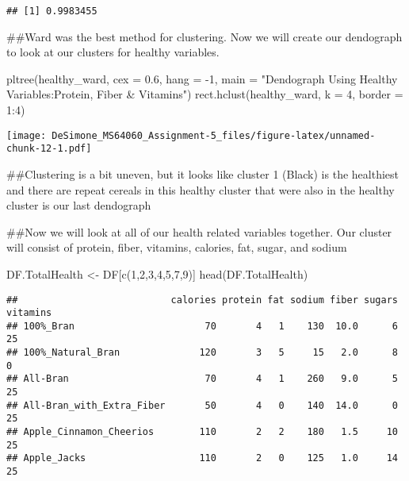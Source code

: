 \documentclass[
]{article}
\newenvironment{Shaded}{\begin{snugshade}}{\end{snugshade}}
\newcommand{\AttributeTok}[1]{\textcolor[rgb]{0.77,0.63,0.00}{#1}}
\newcommand{\DecValTok}[1]{\textcolor[rgb]{0.00,0.00,0.81}{#1}}
\newcommand{\FloatTok}[1]{\textcolor[rgb]{0.00,0.00,0.81}{#1}}
\newcommand{\FunctionTok}[1]{\textcolor[rgb]{0.00,0.00,0.00}{#1}}
\newcommand{\NormalTok}[1]{#1}
\newcommand{\OtherTok}[1]{\textcolor[rgb]{0.56,0.35,0.01}{#1}}
\newcommand{\SpecialCharTok}[1]{\textcolor[rgb]{0.00,0.00,0.00}{#1}}
\newcommand{\StringTok}[1]{\textcolor[rgb]{0.31,0.60,0.02}{#1}}
\begin{document}
\begin{verbatim}
## [1] 0.9983455
\end{verbatim}

\#\#Ward was the best method for clustering. Now we will create our
dendograph to look at our clusters for healthy variables.

\begin{Shaded}
\begin{Highlighting}[]
\FunctionTok{pltree}\NormalTok{(healthy\_ward, }\AttributeTok{cex =} \FloatTok{0.6}\NormalTok{, }\AttributeTok{hang =} \SpecialCharTok{{-}}\DecValTok{1}\NormalTok{, }\AttributeTok{main =} \StringTok{"Dendograph Using Healthy Variables:Protein, Fiber \& Vitamins"}\NormalTok{)}
\FunctionTok{rect.hclust}\NormalTok{(healthy\_ward, }\AttributeTok{k =} \DecValTok{4}\NormalTok{, }\AttributeTok{border =} \DecValTok{1}\SpecialCharTok{:}\DecValTok{4}\NormalTok{)}
\end{Highlighting}
\end{Shaded}

\texttt{[image: DeSimone\_MS64060\_Assignment-5\_files/figure-latex/unnamed-chunk-12-1.pdf]}

\#\#Clustering is a bit uneven, but it looks like cluster 1 (Black) is
the healthiest and there are repeat cereals in this healthy cluster that
were also in the healthy cluster is our last dendograph

\#\#Now we will look at all of our health related variables together.
Our cluster will consist of protein, fiber, vitamins, calories, fat,
sugar, and sodium

\begin{Shaded}
\begin{Highlighting}[]
\NormalTok{DF.TotalHealth }\OtherTok{\textless{}{-}}\NormalTok{ DF[}\FunctionTok{c}\NormalTok{(}\DecValTok{1}\NormalTok{,}\DecValTok{2}\NormalTok{,}\DecValTok{3}\NormalTok{,}\DecValTok{4}\NormalTok{,}\DecValTok{5}\NormalTok{,}\DecValTok{7}\NormalTok{,}\DecValTok{9}\NormalTok{)]}
\FunctionTok{head}\NormalTok{(DF.TotalHealth)}
\end{Highlighting}
\end{Shaded}

\begin{verbatim}
##                           calories protein fat sodium fiber sugars vitamins
## 100%_Bran                       70       4   1    130  10.0      6       25
## 100%_Natural_Bran              120       3   5     15   2.0      8        0
## All-Bran                        70       4   1    260   9.0      5       25
## All-Bran_with_Extra_Fiber       50       4   0    140  14.0      0       25
## Apple_Cinnamon_Cheerios        110       2   2    180   1.5     10       25
## Apple_Jacks                    110       2   0    125   1.0     14       25
\end{verbatim}
\end{document}
